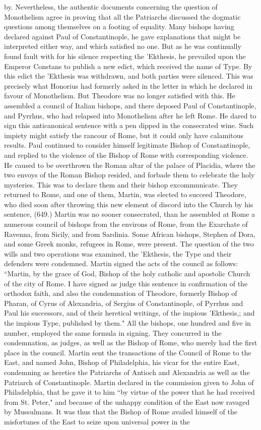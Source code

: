 by. Nevertheless, the authentic documents concerning the question of Monothelism agree in proving that all the Patriarchs discussed the dogmatic questions among themselves on a footing of equality. Many bishops having declared against Paul of Constantinople, he gave explanations that might be interpreted either way, and which satisfied no one. But as he was continually found fault with for his silence respecting the 'Ekthesis, he prevailed upon the Emperor Constans to publish a new edict, which received the name of Type. By this edict the 'Ekthesis was withdrawn, and both parties were silenced. This was precisely what Honorius had formerly asked in the letter in which he declared in favour of Monothelism. But Theodore was no longer satisfied with this. He assembled a council of Italian bishops, and there deposed Paul of Constantinople, and Pyrrhus, who had relapsed into Monothelism after he left Rome. He dared to sign this anticanonical sentence with a pen dipped in the consecrated wine. Such impiety might satisfy the rancour of Rome, but it could only have calamitous results. Paul continued to consider himself legitimate Bishop of Constantinople, and replied to the violence of the Bishop of Rome with corresponding violence. He caused to be overthrown the Roman altar of the palace of Placidia, where the two envoys of the Roman Bishop resided, and forbade them to celebrate the holy mysteries. This was to declare them and their bishop excommunicate. They returned to Rome, and one of them, Martin, was elected to succeed Theodore, who died soon after throwing this new element of discord into the Church by his sentence, (649.) Martin was no sooner consecrated, than he assembled at Rome a numerous council of bishops from the environs of Rome, from the Exarchate of Ravenna, from Sicily, and from Sardinia. Some African bishops, Stephen of Dora, and some Greek monks, refugees in Rome, were present. The question of the two wills and two operations was examined, the 'Ekthesis, the Type and their defenders were condemned. Martin signed the acts of the council as follows: “Martin, by the grace of God, Bishop of the holy catholic and apostolic Church of the city of Rome. I have signed as judge this sentence in confirmation of the orthodox faith, and also the condemnation of Theodore, formerly Bishop of Pharan, of Cyrus of Alexandria, of Sergius of Constantinople, of Pyrrhus and Paul his successors, and of their heretical writings, of the impious 'Ekthesis,; and the impious Type, published by them." All the bishops, one hundred and five in number, employed the same formula in signing. They concurred in the condemnation, as judges, as well as the Bishop of Rome, who merely had the first place in the council. Martin sent the transactions of the Council of Rome to the East, and named John, Bishop of Philadelphia, his vicar for the entire East, condemning as heretics the Patriarchs of Antioch and Alexandria as well as the Patriarch of Constantinople. Martin declared in the commission given to John of Philadelphia, that he gave it to him “by virtue of the power that he had received from St. Peter," and because of the unhappy condition of the East now ravaged by Mussulmans. It was thus that the Bishop of Rome availed himself of the misfortunes of the East to seize upon universal power in the 